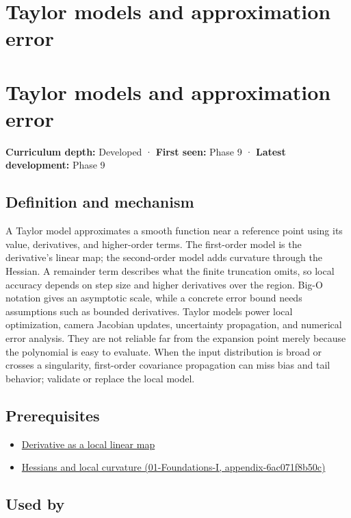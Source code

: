 \hypertarget{appendix-32f39e9a3738}{}
\section*{Taylor models and approximation error}
\section{Taylor models and approximation error}\label{taylor-models-and-approximation-error}

\textbf{Curriculum depth:} Developed · \textbf{First seen:} Phase 9 · \textbf{Latest development:} Phase 9

\subsection{Definition and mechanism}\label{definition-and-mechanism}

A Taylor model approximates a smooth function near a reference point using its value, derivatives, and higher-order terms. The first-order model is the derivative's linear map; the second-order model adds curvature through the Hessian. A remainder term describes what the finite truncation omits, so local accuracy depends on step size and higher derivatives over the region. Big-O notation gives an asymptotic scale, while a concrete error bound needs assumptions such as bounded derivatives. Taylor models power local optimization, camera Jacobian updates, uncertainty propagation, and numerical error analysis. They are not reliable far from the expansion point merely because the polynomial is easy to evaluate. When the input distribution is broad or crosses a singularity, first-order covariance propagation can miss bias and tail behavior; validate or replace the local model.

\subsection{Prerequisites}\label{prerequisites}

\begin{itemize}
\tightlist
\item
  \hyperref[appendix-7bc181935c42]{Derivative as a local linear map}
\item
  \href{}{Hessians and local curvature (01-Foundations-I, appendix-6ac071f8b50c)}
\end{itemize}

\subsection{Used by}\label{used-by}

